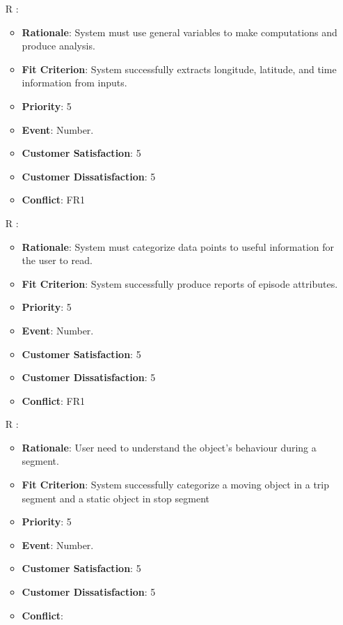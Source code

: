 \documentclass[12pt, titlepage]{article}
\newcounter{reqnum} %
\begin{document}
\begin{itemize}
\item[R\refstepcounter{reqnum}\thereqnum
\label{R_Inputs_2}:] 
\begin{itemize}
    \item \textbf{Rationale}: System must use general variables to make computations and produce analysis.
    \item \textbf{Fit Criterion}: System successfully extracts longitude, latitude, and time information from inputs.
    \item \textbf{Priority}: 5
    \item \textbf{Event}: Number.
    \item \textbf{Customer Satisfaction}: 5
    \item \textbf{Customer Dissatisfaction}: 5
    \item \textbf{Conflict}: FR1
\end{itemize}

\item[R\refstepcounter{reqnum}\thereqnum
\label{R_Outputs_1}:] 
\begin{itemize}
    \item \textbf{Rationale}: System must categorize data points to useful information for the user to read.
    \item \textbf{Fit Criterion}: System successfully produce reports of episode attributes. 
    \item \textbf{Priority}: 5
    \item \textbf{Event}: Number.
    \item \textbf{Customer Satisfaction}: 5
    \item \textbf{Customer Dissatisfaction}: 5
    \item \textbf{Conflict}: FR1
\end{itemize}

\item[R\refstepcounter{reqnum}\thereqnum
\label{R_Outputs_2}:] 
\begin{itemize}
    \item \textbf{Rationale}: User need to understand the object's behaviour during a segment.
    \item \textbf{Fit Criterion}: System successfully categorize a moving object in a trip segment and a static object in stop segment
    \item \textbf{Priority}: 5
    \item \textbf{Event}: Number.
    \item \textbf{Customer Satisfaction}: 5
    \item \textbf{Customer Dissatisfaction}: 5
    \item \textbf{Conflict}:
\end{itemize}


\end{itemize}
\end{document}
